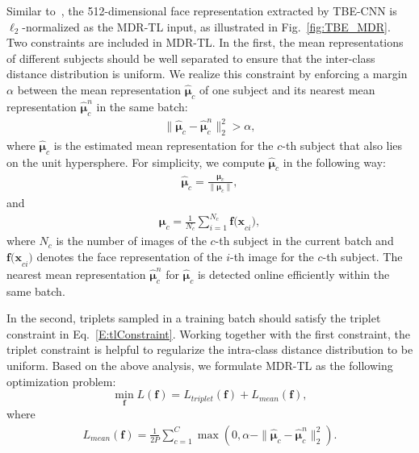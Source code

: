 \documentclass[10pt,journal,cspaper,compsoc]{IEEEtran}
\begin{document}
Similar to~\cite{schroff2015facenet}, the 512-dimensional face representation extracted by TBE-CNN is $\ell_2$-normalized as the MDR-TL input, as illustrated in Fig.~\ref{fig:TBE_MDR}.
Two constraints are included in MDR-TL.
In the first, the mean representations of different subjects should be well separated to ensure that the inter-class distance distribution is uniform.
We realize this constraint by enforcing a margin $\alpha$ between the mean representation $\hat{\bm{\mu}}_{c}$ of one subject and its nearest mean representation $\hat{\bm{\mu}}_{c}^n$ in the same batch:
\begin{equation}\label{E:InterConstraint}
\begin{array}{ll}
\|\hat{\bm{\mu}}_{c}-\hat{\bm{\mu}}_{c}^n\|_2^2>\alpha,
\end{array}
\end{equation}
where $\hat{\bm{\mu}}_{c}$ is the estimated mean representation for the $c$-th subject that also lies on the unit hypersphere. For simplicity, we compute $\hat{\bm{\mu}}_{c}$ in the following way:
\begin{align}
\hat{\bm{\mu}}_{c}=\frac{\bm{\mu}_{c}}{\|\bm{\mu}_{c}\|},
\end{align}
and
\begin{align}
\bm{\mu}_{c}=\frac{1}{N_{c}} \sum_{i=1}^{N_{c}}\mathbf{f(x}_{ci}),
\end{align}
where $N_{c}$ is the number of images of the $c$-th subject in the current batch and $\mathbf{f(x}_{ci})$ denotes the face representation of the $i$-th image for the $c$-th subject.
The nearest mean representation $\hat{\bm{\mu}}_{c}^n$ for $\hat{\bm{\mu}}_{c}$ is detected online efficiently within the same batch.

In the second, triplets sampled in a training batch should satisfy the triplet constraint in Eq.~\ref{E:tlConstraint}.
Working together with the first constraint, the triplet constraint is helpful to regularize the intra-class distance distribution to be uniform.
Based on the above analysis, we formulate MDR-TL as the following optimization problem:
\begin{equation}\label{E:MDRTL}
\min\limits_{\mathbf{f}}L(\mathbf{f})=L_{triplet}(\mathbf{f}) + L_{mean}(\mathbf{f}),
\end{equation}
where
\begin{align}\label{E:meanDistance}
L_{mean}(\mathbf{f})=\frac{1}{2P} \sum_{c=1}^C \max(0, \alpha-\|\hat{\bm{\mu}}_{c}-\hat{\bm{\mu}}_{c}^n\|_2^2).
\end{align}
\end{document}
